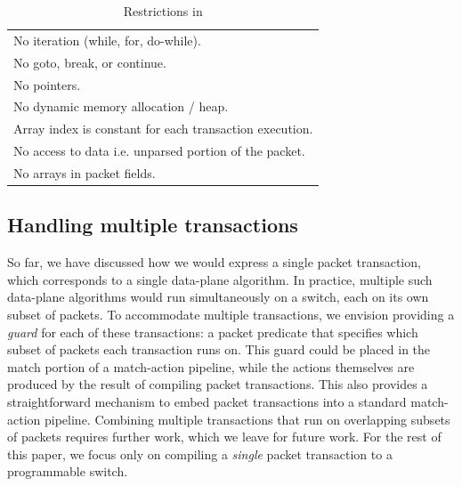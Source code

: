\begin{table}
  \begin{tabular}{p{}}
    No iteration (while, for, do-while).\\
    No goto, break, or continue.\\
    No pointers.\\
    No dynamic memory allocation / heap.\\
    Array index is constant for each transaction execution.\\
    No access to data i.e. unparsed portion of the packet.\\
    No arrays in packet fields.\\
  \end{tabular}
  \caption{Restrictions in \pktlanguage}
  \label{tab:restrict}
\end{table}

\subsection{Handling multiple transactions}
\label{ss:multiple}

So far, we have discussed how we would express a single packet transaction,
which corresponds to a single data-plane algorithm. In practice, multiple such
data-plane algorithms would run simultaneously on a switch, each on its own
subset of packets. To accommodate multiple transactions, we envision providing
a \textit{guard} for each of these transactions: a packet predicate that
specifies which subset of packets each transaction runs on. This guard could be
placed in the match portion of a match-action pipeline, while the actions
themselves are produced by the result of compiling packet transactions. This
also provides a straightforward mechanism to embed packet transactions into a
standard match-action pipeline. Combining multiple transactions that run on
overlapping subsets of packets requires further work, which we leave for future
work. For the rest of this paper, we focus only on compiling a \textit{single}
packet transaction to a programmable switch.

